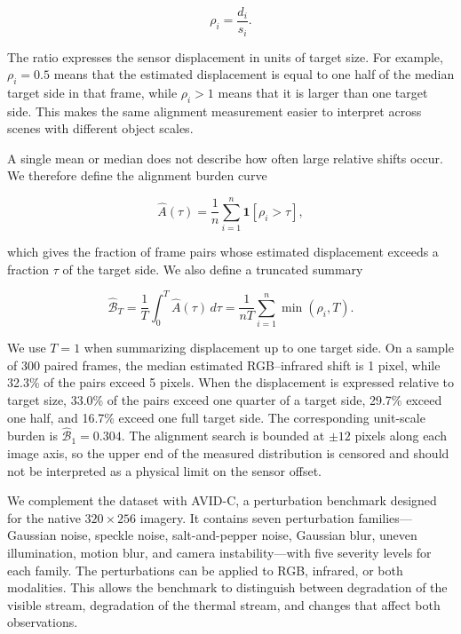\documentclass[10pt]{article}
\newcommand{\corrupt}{\textsc{AVID-C}}
\newcommand{\burden}{\widehat A}
\begin{document}
\begin{equation}
\rho_i = \frac{d_i}{s_i}.
\label{eq:rho}
\end{equation}

The ratio expresses the sensor displacement in units of target size. For example, $\rho_i=0.5$ means that the estimated displacement is equal to one half of the median target side in that frame, while $\rho_i>1$ means that it is larger than one target side. This makes the same alignment measurement easier to interpret across scenes with different object scales.

A single mean or median does not describe how often large relative shifts occur. We therefore define the alignment burden curve

\begin{equation}
\burden(\tau)=\frac{1}{n}\sum_{i=1}^{n}\mathbf{1}[\rho_i>\tau],
\label{eq:burden}
\end{equation}

which gives the fraction of frame pairs whose estimated displacement exceeds a fraction $\tau$ of the target side. We also define a truncated summary

\begin{equation}
\widehat{\mathcal B}_{T}
=
\frac{1}{T}\int_0^{T}\burden(\tau)\,d\tau
=
\frac{1}{nT}\sum_{i=1}^{n}\min(\rho_i,T).
\label{eq:burdenscore}
\end{equation}

We use $T=1$ when summarizing displacement up to one target side. On a sample of 300 paired frames, the median estimated RGB--infrared shift is 1 pixel, while 32.3\% of the pairs exceed 5 pixels. When the displacement is expressed relative to target size, 33.0\% of the pairs exceed one quarter of a target side, 29.7\% exceed one half, and 16.7\% exceed one full target side. The corresponding unit-scale burden is $\widehat{\mathcal B}_1=0.304$. The alignment search is bounded at $\pm12$ pixels along each image axis, so the upper end of the measured distribution is censored and should not be interpreted as a physical limit on the sensor offset.

We complement the dataset with \corrupt{}, a perturbation benchmark designed for the native $320\times256$ imagery. It contains seven perturbation families---Gaussian noise, speckle noise, salt-and-pepper noise, Gaussian blur, uneven illumination, motion blur, and camera instability---with five severity levels for each family. The perturbations can be applied to RGB, infrared, or both modalities. This allows the benchmark to distinguish between degradation of the visible stream, degradation of the thermal stream, and changes that affect both observations.
\end{document}

